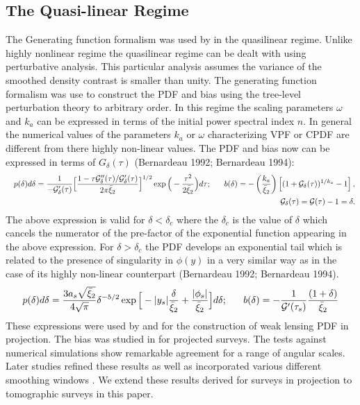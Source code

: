 \documentclass[usenatbib]{mn2e}
\begin{document}
\subsection{The Quasi-linear Regime}
\label{subsec:quasi}
The Generating function formalism was used by \citep{B92,B94} in the quasilinear
regime. Unlike highly nonlinear regime the quasilinear regime can be dealt with 
using perturbative analysis. This particular analysis assumes the variance 
of the smoothed density contrast is smaller than unity. The generating function
formalism was use to construct the PDF and bias using the tree-level
perturbation theory to arbitrary order. In this regime the scaling parameters 
$\omega$ and $k_a$ can be expressed in terms of the initial power spectral index $n$.
In general the numerical values of the parameters $k_a$ or $\omega$ characterizing VPF
or CPDF are different from there highly non-linear values. 
The PDF and bias now can be expressed in terms of $G_{\delta}(\tau)$
(Bernardeau 1992; Bernardeau 1994): 
\begin{eqnarray}
&&p(\delta)d \delta = { 1 \over -{\cal G}_{\delta}'(\tau) } \Big [ { 1 - \tau {\cal G}_{\delta}''(\tau)
/{\cal G}_{\delta}'(\tau) \over 2 \pi {\bar \xi}_{2} }  \Big ]^{1/2} \exp \Big ( -{ \tau^2
\over 2 {\bar \xi}_{2}} \Big ) d \tau; ~~~~~ b(\delta) = - \left (
{k_a \over \bar \xi_2} \right ) \left [ ( 1 + {\cal G}_{\delta}(\tau)
)^{1/k_a} - 1 \right ] , \\
&&{\cal G}_{\delta}(\tau) = {\cal G}(\tau) - 1 =  \delta.
\end{eqnarray}
The above expression is valid for $\delta < \delta_c$ where the $\delta_c$
is the value of $\delta$ which cancels the numerator of the pre-factor 
of the exponential function appearing in the above expression. For
$\delta > \delta_c$ the PDF develops an exponential tail which is 
related to the presence of singularity in $\phi(y)$ in a very similar
way as in the case of its highly non-linear counterpart (Bernardeau
1992; Bernardeau 1994).
\begin{equation}
p(\delta) d \delta = { 3 a_s \sqrt {{\bar \xi}_2} \over 4  {\sqrt \pi} }
\delta^{-5/2} \exp \Big [ -|y_s|{ \delta \over {\bar \xi}_{2}} + {|\phi_s|
\over {\bar \xi}_{2}} \Big ] d \delta; ~~~~~b(\delta) = -{ 1 \over
{\cal G}'(\tau_s)} {(1 + \delta)
\over { {\bar \xi}_2}} 
\end{equation}
These expressions were used by \cite{MuJai01, MuJai00} and \cite{Valageas00} for the construction of 
weak lensing PDF in projection. The bias was studied in \citep{Mu00} for projected surveys.
The tests against numerical simulations show remarkable agreement for a range of angular scales.
Later studies refined these results as well as incorporated various different smoothing windows 
\citep{MuVaBa04,VaMuBa05}. We extend these results derived for surveys in
projection to tomographic surveys in this paper.
\end{document}
